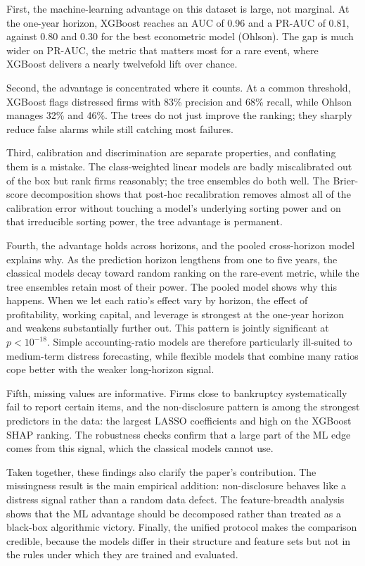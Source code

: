 \documentclass[12pt,a4paper]{article}
\begin{document}
First, the machine-learning advantage on this dataset is large, not marginal.
At the one-year horizon, XGBoost reaches an AUC of 0.96 and a PR-AUC of 0.81,
against 0.80 and 0.30 for the best econometric model (Ohlson). The gap is much
wider on PR-AUC, the metric that matters most for a rare event, where XGBoost
delivers a nearly twelvefold lift over chance.

Second, the advantage is concentrated where it counts. At a common threshold,
XGBoost flags distressed firms with 83\% precision and 68\% recall, while
Ohlson manages 32\% and 46\%. The trees do not just improve the ranking;
they sharply reduce false alarms while still catching most failures.

Third, calibration and discrimination are separate properties, and conflating
them is a mistake. The class-weighted linear models are badly miscalibrated
out of the box but rank firms reasonably; the tree ensembles do both well. The
Brier-score decomposition shows that post-hoc recalibration removes almost all
of the calibration error without touching a model's underlying sorting power
and on that irreducible sorting power, the tree advantage is permanent.

Fourth, the advantage holds across horizons, and the pooled cross-horizon
model explains why. As the prediction horizon lengthens from one to five years,
the classical models decay toward random ranking on the rare-event metric,
while the tree ensembles retain most of their power. The pooled model shows
why this happens. When we let each ratio's effect vary by horizon, the effect
of profitability, working capital, and leverage is strongest at the one-year
horizon and weakens substantially further out. This pattern is jointly
significant at $p < 10^{-18}$. Simple accounting-ratio models are therefore
particularly ill-suited to medium-term distress forecasting, while flexible
models that combine many ratios cope better with the weaker long-horizon
signal.

Fifth, missing values are informative. Firms close to bankruptcy
systematically fail to report certain items, and the non-disclosure pattern
is among the strongest predictors in the data: the largest LASSO
coefficients and high on the XGBoost SHAP ranking. The robustness checks
confirm that a large part of the ML edge comes from this signal, which the
classical models cannot use.


Taken together, these findings also clarify the paper's contribution. The
missingness result is the main empirical addition: non-disclosure behaves like
a distress signal rather than a random data defect. The feature-breadth
analysis shows that the ML advantage should be decomposed rather than treated
as a black-box algorithmic victory. Finally, the unified protocol makes the
comparison credible, because the models differ in their structure and feature
sets but not in the rules under which they are trained and evaluated.
\end{document}
